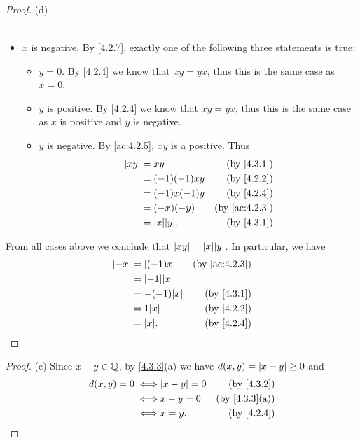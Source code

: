 \begin{proof}{(d)}
\begin{itemize}
\begin{itemize}
\begin{align*}
                  \end{align*}
          \end{itemize}
    \item \(x\) is negative.
          By \cref{4.2.7}, exactly one of the following three statements is true:
          \begin{itemize}
            \item \(y = 0\).
                  By \cref{4.2.4} we know that \(xy = yx\), thus this is the same case as \(x = 0\).
            \item \(y\) is positive.
                  By \cref{4.2.4} we know that \(xy = yx\), thus this is the same case as \(x\) is positive and \(y\) is negative.
            \item \(y\) is negative.
                  By \cref{ac:4.2.5}, \(xy\) is a positive.
                  Thus
                  \begin{align*}
                    \abs{xy} & = xy               & \text{(by \cref{4.3.1})}    \\
                             & = (-1)(-1)xy       & \text{(by \cref{4.2.2})}    \\
                             & = (-1)x(-1)y       & \text{(by \cref{4.2.4})}    \\
                             & = (-x)(-y)         & \text{(by \cref{ac:4.2.3})} \\
                             & = \abs{x} \abs{y}. & \text{(by \cref{4.3.1})}
                  \end{align*}
          \end{itemize}
  \end{itemize}
  From all cases above we conclude that \(\abs{xy} = \abs{x} \abs{y}\).
  In particular, we have
  \begin{align*}
    \abs{-x} & = \abs{(-1)x}      & \text{(by \cref{ac:4.2.3})} \\
             & = \abs{-1} \abs{x}                               \\
             & = -(-1) \abs{x}    & \text{(by \cref{4.3.1})}    \\
             & = 1 \abs{x}        & \text{(by \cref{4.2.2})}    \\
             & = \abs{x}.         & \text{(by \cref{4.2.4})}
  \end{align*}
\end{proof}

\begin{proof}{(e)}
  Since \(x - y \in \mathbb{Q}\), by \cref{4.3.3}(a) we have \(d(x, y) = \left\lvert x - y\right\rvert \geq 0\) and
  \begin{align*}
    d(x, y) = 0
    \iff & \abs{x - y} = 0 & \text{(by \cref{4.3.2})}    \\
    \iff & x - y = 0       & \text{(by \cref{4.3.3}(a))} \\
    \iff & x = y.          & \text{(by \cref{4.2.4})}
  \end{align*}
\end{proof}

